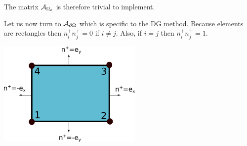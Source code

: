 The matrix ${\cal A}_{\Omega_e}$ is therefore trivial to implement. 



\newpage
Let us now turn to $ {\cal A}_{\partial\Omega}$ which is specific to the DG method.
Because elements are rectangles then $n_i^+n_j^+=0$ if $i \neq j$. 
Also, if $i=j$ then $n_i^+n_j^+=1$. 


\begin{center}
\includegraphics[width=7cm]{images/dgfem/dgelts_q1}
\end{center}


